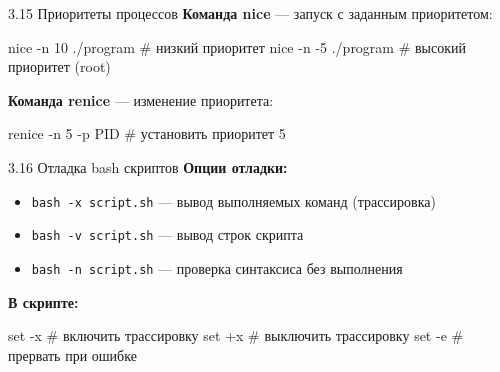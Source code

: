 \documentclass[
  ignorenonframetext,
  aspectratio=169,
  russian,
]{beamer}
\newenvironment{Shaded}{\begin{snugshade}}{\end{snugshade}}
\newcommand{\AttributeTok}[1]{\textcolor[rgb]{0.40,0.45,0.13}{#1}}
\newcommand{\BuiltInTok}[1]{\textcolor[rgb]{0.00,0.23,0.31}{#1}}
\newcommand{\CommentTok}[1]{\textcolor[rgb]{0.37,0.37,0.37}{#1}}
\newcommand{\ExtensionTok}[1]{\textcolor[rgb]{0.00,0.23,0.31}{#1}}
\newcommand{\FunctionTok}[1]{\textcolor[rgb]{0.28,0.35,0.67}{#1}}
\newcommand{\NormalTok}[1]{\textcolor[rgb]{0.00,0.23,0.31}{#1}}
\providecommand{\tightlist}{%
  \setlength{\itemsep}{0pt}\setlength{\parskip}{0pt}}
\begin{document}
\begin{frame}[fragile]{3.15 Приоритеты процессов}
\label{ux43fux440ux438ux43eux440ux438ux442ux435ux442ux44b-ux43fux440ux43eux446ux435ux441ux441ux43eux432}
\textbf{Команда nice} --- запуск с заданным приоритетом:

\begin{Shaded}
\begin{Highlighting}[]
\FunctionTok{nice} \AttributeTok{{-}n}\NormalTok{ 10 ./program    }\CommentTok{\# низкий приоритет}
\FunctionTok{nice} \AttributeTok{{-}n} \AttributeTok{{-}5}\NormalTok{ ./program    }\CommentTok{\# высокий приоритет (root)}
\end{Highlighting}
\end{Shaded}

\textbf{Команда renice} --- изменение приоритета:

\begin{Shaded}
\begin{Highlighting}[]
\ExtensionTok{renice} \AttributeTok{{-}n}\NormalTok{ 5 }\AttributeTok{{-}p}\NormalTok{ PID      }\CommentTok{\# установить приоритет 5}
\end{Highlighting}
\end{Shaded}
\end{frame}

\begin{frame}[fragile]{3.16 Отладка bash скриптов}
\label{ux43eux442ux43bux430ux434ux43aux430-bash-ux441ux43aux440ux438ux43fux442ux43eux432}
\textbf{Опции отладки:}

\begin{itemize}[<+->]
\tightlist
\item
  \texttt{bash\ -x\ script.sh} --- вывод выполняемых команд
  (трассировка)
\item
  \texttt{bash\ -v\ script.sh} --- вывод строк скрипта
\item
  \texttt{bash\ -n\ script.sh} --- проверка синтаксиса без выполнения
\end{itemize}

\textbf{В скрипте:}

\begin{Shaded}
\begin{Highlighting}[]
\BuiltInTok{set} \AttributeTok{{-}x}    \CommentTok{\# включить трассировку}
\BuiltInTok{set}\NormalTok{ +x    }\CommentTok{\# выключить трассировку}
\BuiltInTok{set} \AttributeTok{{-}e}    \CommentTok{\# прервать при ошибке}
\end{Highlighting}
\end{Shaded}
\end{frame}
\end{document}
